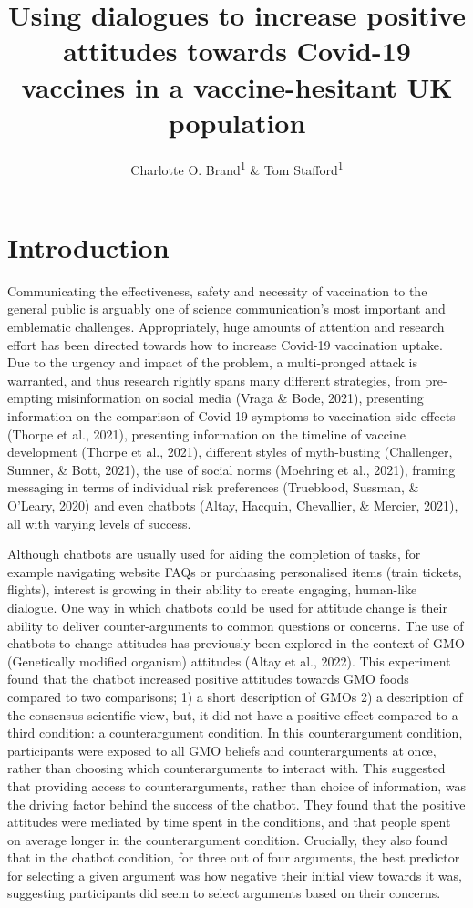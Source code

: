 \documentclass[
  english,
  ,jou,floatsintext]{apa6}
\title{Using dialogues to increase positive attitudes towards Covid-19 vaccines in a vaccine-hesitant UK population}
\author{Charlotte O. Brand\textsuperscript{1} \& Tom Stafford\textsuperscript{1}}
\date{}
\affiliation{\vspace{0.5cm}\textsuperscript{1} University of Sheffield, Department of Psychology}
\begin{document}
\maketitle

\hypertarget{introduction}{%
\section{Introduction}\label{introduction}}

Communicating the effectiveness, safety and necessity of vaccination to the general public is arguably one of science communication's most important and emblematic challenges. Appropriately, huge amounts of attention and research effort has been directed towards how to increase Covid-19 vaccination uptake. Due to the urgency and impact of the problem, a multi-pronged attack is warranted, and thus research rightly spans many different strategies, from pre-empting misinformation on social media (Vraga \& Bode, 2021), presenting information on the comparison of Covid-19 symptoms to vaccination side-effects (Thorpe et al., 2021), presenting information on the timeline of vaccine development (Thorpe et al., 2021), different styles of myth-busting (Challenger, Sumner, \& Bott, 2021), the use of social norms (Moehring et al., 2021), framing messaging in terms of individual risk preferences (Trueblood, Sussman, \& O'Leary, 2020) and even chatbots (Altay, Hacquin, Chevallier, \& Mercier, 2021), all with varying levels of success.

Although chatbots are usually used for aiding the completion of tasks, for example navigating website FAQs or purchasing personalised items (train tickets, flights), interest is growing in their ability to create engaging, human-like dialogue. One way in which chatbots could be used for attitude change is their ability to deliver counter-arguments to common questions or concerns. The use of chatbots to change attitudes has previously been explored in the context of GMO (Genetically modified organism) attitudes (Altay et al., 2022). This experiment found that the chatbot increased positive attitudes towards GMO foods compared to two comparisons; 1) a short description of GMOs 2) a description of the consensus scientific view, but, it did not have a positive effect compared to a third condition: a counterargument condition. In this counterargument condition, participants were exposed to all GMO beliefs and counterarguments at once, rather than choosing which counterarguments to interact with. This suggested that providing access to counterarguments, rather than choice of information, was the driving factor behind the success of the chatbot. They found that the positive attitudes were mediated by time spent in the conditions, and that people spent on average longer in the counterargument condition. Crucially, they also found that in the chatbot condition, for three out of four arguments, the best predictor for selecting a given argument was how negative their initial view towards it was, suggesting participants did seem to select arguments based on their concerns.
\end{document}
